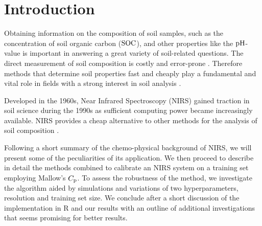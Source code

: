 \section{Introduction}
\label{sec:introduction}
	
	Obtaining information on the composition of soil samples, such as the concentration of soil organic carbon ($\mathrm{SOC}$), and other properties like the $\mathrm{pH}$-value is important in answering a great variety of soil-related questions.	
	The direct measurement of soil composition is costly and error-prone \cite[1-3]{mclaughlin:99a}.
	Therefore methods that determine soil properties fast and cheaply play a fundamental and vital role in fields with a strong interest in soil analysis \cite{ludwig:01a}.

	Developed in the 1960s, Near Infrared Spectroscopy (NIRS) gained traction in soil science during the 1990s as sufficient computing power became increasingly available.
	NIRS provides a cheap alternative to other methods for the analysis of soil composition \cite[247]{agelet:10a}.

	Following a short summary of the chemo-physical background of NIRS, we will present some of the peculiarities of its application.
	We then proceed to describe in detail the methods combined to calibrate an NIRS system on a training set employing Mallow's $C_{\mathrm{p}}$.
	To assess the robustness of the method, we investigate the algorithm aided by simulations and variations of two hyperparameters, resolution and training set size.
	We conclude after a short discussion of the implementation in \textsf{R} %
	and our results with an outline of additional investigations that seems promising for better results.


